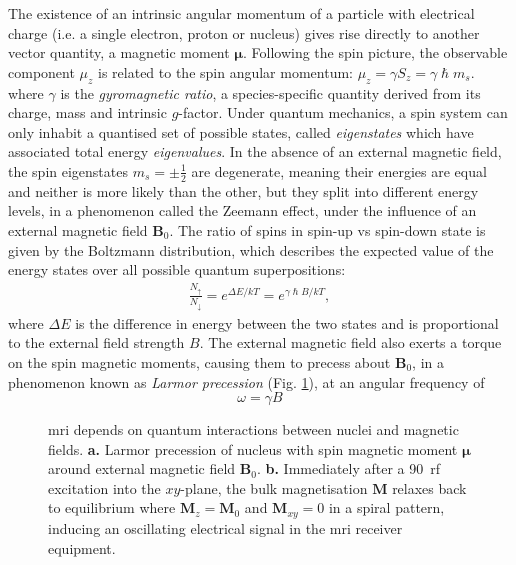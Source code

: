 The existence of an intrinsic angular momentum of a particle with electrical charge (i.e. a single electron, proton or nucleus) gives rise directly to another vector quantity, a magnetic moment $\bm{\mu}$.
Following the spin picture, the observable component $\mu_z$ is related to the spin angular momentum: $\mu_z = \gamma S_z = \gamma \hslash m_s $.
where $\gamma$ is the \textit{gyromagnetic ratio}, a species-specific quantity derived from its charge, mass and intrinsic $g$-factor.
Under quantum mechanics, a spin system can only inhabit a quantised set of possible states, called \textit{eigenstates} which have associated total energy \textit{eigenvalues}.
In the absence of an external magnetic field, the spin eigenstates $m_s = \pm \frac{1}{2}$ are degenerate, meaning their energies are equal and neither is more likely than the other, but they split into different energy levels, in a phenomenon called the Zeemann effect, under the influence of an external magnetic field $\mathbf{B}_0$.
The ratio of spins in spin-up vs spin-down state is given by the Boltzmann distribution, which describes the expected value of the energy states over all possible quantum superpositions:
\begin{align}
  \frac{N_{\uparrow}}{N_{\downarrow}} = e^{\Delta E / k T} = e^{\gamma \hslash B / k T}, \label{eq:boltzmann}
\end{align}
where $\Delta E$ is the difference in energy between the two states and is proportional to the external field strength $B$.
The external magnetic field also exerts a torque on the spin magnetic moments, causing them to precess about $\mathbf{B}_0$, in a phenomenon known as \textit{Larmor precession} (Fig. \ref{fig:larmor}), at an angular frequency of
\begin{equation}
  \omega = \gamma B
\end{equation}

\begin{figure}
    \centering
    \qquad%
    
  \caption[Larmor precession and magnetisation relaxation]{\Gls{mri} depends on quantum interactions between nuclei and magnetic fields.
  \textbf{\sffamily a.} Larmor precession of nucleus with spin magnetic moment $\bm{\mu}$ around external magnetic field $\mathbf{B}_0$.
  \textbf{\sffamily b.} Immediately after a 90\textdegree\ \gls{rf} excitation into the $xy$-plane, the bulk magnetisation $\mathbf{M}$ relaxes back to equilibrium where $\mathbf{M}_z=\mathbf{M}_0$ and $\mathbf{M}_{xy}=0$ in a spiral pattern, inducing an oscillating electrical signal in the \gls{mri} receiver equipment.}\label{fig:larmor}
\end{figure}


